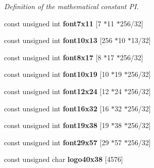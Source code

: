 \begin{DoxyCompactItemize}
\begin{DoxyCompactList}\small\item\em Definition of the mathematical constant P\-I. \end{DoxyCompactList}\item 
\hypertarget{namespacecimg__library_1_1cimg_a3568159b7010cc43787ffe6bba1b7db2}{const unsigned int {\bfseries font7x11} \mbox{[}7 $\ast$11 $\ast$256/32\mbox{]}}\label{namespacecimg__library_1_1cimg_a3568159b7010cc43787ffe6bba1b7db2}

\item 
\hypertarget{namespacecimg__library_1_1cimg_a4c82e77019dc6faff225d660a4ce5a20}{const unsigned int {\bfseries font10x13} \mbox{[}256 $\ast$10 $\ast$13/32\mbox{]}}\label{namespacecimg__library_1_1cimg_a4c82e77019dc6faff225d660a4ce5a20}

\item 
\hypertarget{namespacecimg__library_1_1cimg_af1219fbd9740fedf5fd02824c4ec42f3}{const unsigned int {\bfseries font8x17} \mbox{[}8 $\ast$17 $\ast$256/32\mbox{]}}\label{namespacecimg__library_1_1cimg_af1219fbd9740fedf5fd02824c4ec42f3}

\item 
\hypertarget{namespacecimg__library_1_1cimg_a7dcb5974dbf9283207fb8377e5aee88d}{const unsigned int {\bfseries font10x19} \mbox{[}10 $\ast$19 $\ast$256/32\mbox{]}}\label{namespacecimg__library_1_1cimg_a7dcb5974dbf9283207fb8377e5aee88d}

\item 
\hypertarget{namespacecimg__library_1_1cimg_a249e878ab6f8b99f1a0e67679d58974f}{const unsigned int {\bfseries font12x24} \mbox{[}12 $\ast$24 $\ast$256/32\mbox{]}}\label{namespacecimg__library_1_1cimg_a249e878ab6f8b99f1a0e67679d58974f}

\item 
\hypertarget{namespacecimg__library_1_1cimg_a7bc04f7144f3dbfd0499d80e2911564f}{const unsigned int {\bfseries font16x32} \mbox{[}16 $\ast$32 $\ast$256/32\mbox{]}}\label{namespacecimg__library_1_1cimg_a7bc04f7144f3dbfd0499d80e2911564f}

\item 
\hypertarget{namespacecimg__library_1_1cimg_ac2c1c25ffa2ceb4063ff39e5198a186d}{const unsigned int {\bfseries font19x38} \mbox{[}19 $\ast$38 $\ast$256/32\mbox{]}}\label{namespacecimg__library_1_1cimg_ac2c1c25ffa2ceb4063ff39e5198a186d}

\item 
\hypertarget{namespacecimg__library_1_1cimg_a1072daf041b6eb82545ca7494ceb3ff7}{const unsigned int {\bfseries font29x57} \mbox{[}29 $\ast$57 $\ast$256/32\mbox{]}}\label{namespacecimg__library_1_1cimg_a1072daf041b6eb82545ca7494ceb3ff7}

\item 
const unsigned char {\bfseries logo40x38} \mbox{[}4576\mbox{]}
\end{DoxyCompactItemize}



